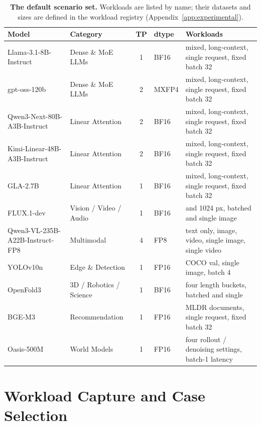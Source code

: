 \begin{table}[H]
  \centering
  \caption{\textbf{The default scenario set.} Workloads are listed by name; their datasets and sizes are defined in the workload registry (Appendix~\ref{app:experimental}).}
  \label{tab:default_scenarios}
  \scriptsize
  \setlength{\tabcolsep}{3pt}
  \begin{tabular}{@{}llcl>{\raggedright\arraybackslash}p{5.6cm}@{}}
  \toprule
  \textbf{Model} & \textbf{Category} & \textbf{TP} & \textbf{dtype} & \textbf{Workloads} \\
  \midrule
  Llama-3.1-8B-Instruct & Dense \& MoE LLMs & 1 & BF16 & mixed, long-context, single request, fixed batch 32 \\
  gpt-oss-120b & Dense \& MoE LLMs & 2 & MXFP4 & mixed, long-context, single request, fixed batch 32 \\
  Qwen3-Next-80B-A3B-Instruct & Linear Attention & 2 & BF16 & mixed, long-context, single request, fixed batch 32 \\
  Kimi-Linear-48B-A3B-Instruct & Linear Attention & 2 & BF16 & mixed, long-context, single request, fixed batch 32 \\
  GLA-2.7B & Linear Attention & 1 & BF16 & mixed, long-context, single request, fixed batch 32 \\
  FLUX.1-dev & Vision / Video / Audio & 1 & BF16 & 512 and 1024 px, batched and single image \\
  Qwen3-VL-235B-A22B-Instruct-FP8 & Multimodal & 4 & FP8 & text only, image, video, single image, single video \\
  YOLOv10n & Edge \& Detection & 1 & FP16 & COCO val, single image, batch 4 \\
  OpenFold3 & 3D / Robotics / Science & 1 & BF16 & four length buckets, batched and single \\
  BGE-M3 & Recommendation & 1 & FP16 & MLDR documents, single request, fixed batch 32 \\
  Oasis-500M & World Models & 1 & FP16 & four rollout / denoising settings, batch-1 latency \\
  \bottomrule
  \end{tabular}
\end{table}

\section{Workload Capture and Case Selection}
\label{app:capture}

